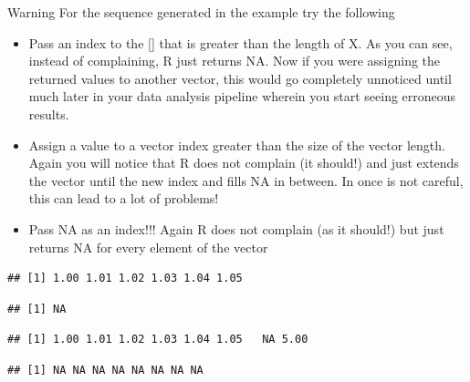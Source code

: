 \begin{DIY}{Warning}
For the sequence generated in the example try the following
\begin{itemize}
  \item Pass an index to the [] that is greater than the length of X. As you can see, instead of complaining, R just returns NA. Now if you were assigning the returned values to another vector, this would go completely unnoticed until much later in your data analysis pipeline wherein you start seeing erroneous results.
  \item Assign a value to a vector index greater than the size of the vector length. Again you will notice that R does not complain (it should!) and just extends the vector until the new index and fills NA in between. In once is not careful, this can lead to a lot of problems!  
  \item Pass NA as an index!!! Again R does not complain (as it should!) but just returns NA for every element of the vector
\end{itemize}
\begin{knitrout}
\color{fgcolor}\begin{kframe}
\begin{alltt}
\hlkwb{<-}\hlstd{(}\hlstd{,}\hlstd{,}\hlstd{=}\hlstd{)}
\end{alltt}
\begin{verbatim}
## [1] 1.00 1.01 1.02 1.03 1.04 1.05
\end{verbatim}
\begin{alltt}
\hlstd{X[}\hlstd{]}
\end{alltt}
\begin{verbatim}
## [1] NA
\end{verbatim}
\begin{alltt}
\hlstd{X[}\hlstd{]}\hlkwb{<-}
\end{alltt}
\begin{verbatim}
## [1] 1.00 1.01 1.02 1.03 1.04 1.05   NA 5.00
\end{verbatim}
\begin{alltt}
\hlstd{X[}\hlstd{]}
\end{alltt}
\begin{verbatim}
## [1] NA NA NA NA NA NA NA NA
\end{verbatim}
\end{kframe}
\end{knitrout}
\end{DIY}

